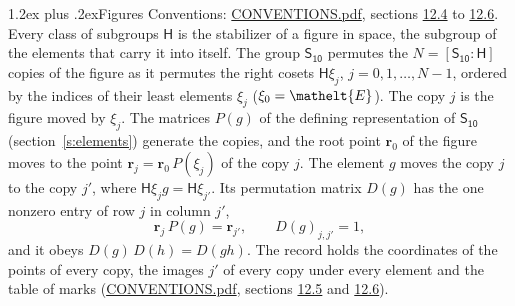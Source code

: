 \documentclass[10pt,a4paper]{article}
\makeatletter
\renewcommand\section{\@startsection{section}{1}{\z@}{-3ex plus -1ex minus -.2ex}%
  {1.2ex plus .2ex}{\normalfont\large\sffamily\bfseries\color{parttitle}}}
\numberwithin{equation}{section}
\newcommand{\eltfont}[1]{{\let\sigma\eltsigma\mathelt{#1}}}
\newcommand{\grp}[1]{\mathsf{#1}}
\newcommand{\cls}[1]{\eltfont{#1}}
\newcommand{\pointr}{\mathbf{r}}
\makeatother
\begin{document}
\section{Figures}\label{s:permutation}
Conventions: \href{../../CONVENTIONS.pdf}{CONVENTIONS.pdf}, sections \href{../../CONVENTIONS.pdf\#conv.12.4}{12.4} to \href{../../CONVENTIONS.pdf\#conv.12.6}{12.6}.
Every class of subgroups $\grp{H}$ is the stabilizer of a figure in space, the subgroup of the elements that carry it into itself. \label{n:local.orbit.size}\label{n:element.coset.least}\label{n:index.coset}The group $\grp{S_{10}}$ permutes the $N = [\grp{S_{10}} : \grp{H}]$ copies of the figure as it permutes the right cosets $\grp{H}\xi_j$, $j = 0, 1, \dots, N - 1$, ordered by the indices of their least elements $\xi_j$ ($\xi_0 = \cls{E}$). The copy $j$ is the figure moved by $\xi_j$. The matrices $P(g)$ of the defining representation of $\grp{S_{10}}$ (section~\ref{s:elements}) generate the copies, and the root point $\pointr_0$ of the figure moves to the point $\pointr_j = \pointr_0\, P(\xi_j)$ of the copy $j$. \label{n:local.coset.image}The element $g$ moves the copy $j$ to the copy $j'$, where $\grp{H}\xi_j g = \grp{H}\xi_{j'}$. \label{n:local.matrix.permutation}Its permutation matrix $D(g)$ has the one nonzero entry of row $j$ in column $j'$,
\begin{equation}\label{e:perm.matrix}\pointr_j\, P(g) = \pointr_{j'}, \qquad D(g)_{j,j'} = 1,\end{equation}
and it obeys $D(g)\, D(h) = D(gh)$. The record holds the coordinates of the points of every copy, the images $j'$ of every copy under every element and the table of marks (\href{../../CONVENTIONS.pdf}{CONVENTIONS.pdf}, sections \href{../../CONVENTIONS.pdf\#conv.12.5}{12.5} and \href{../../CONVENTIONS.pdf\#conv.12.6}{12.6}).
\end{document}
